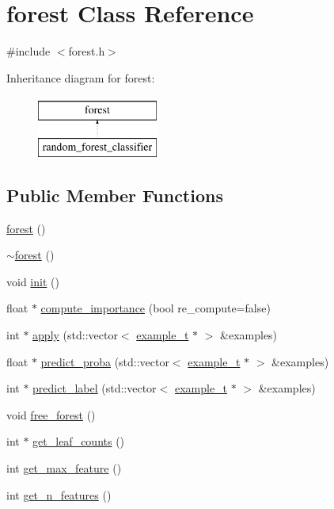 \hypertarget{classforest}{\section{forest Class Reference}
\label{classforest}
}


{\ttfamily \#include $<$forest.\+h$>$}

Inheritance diagram for forest\+:\begin{figure}[H]
\begin{center}
\leavevmode
\includegraphics[height=2.000000cm]{classforest}
\end{center}
\end{figure}
\subsection*{Public Member Functions}
\begin{DoxyCompactItemize}
\item 
\hyperlink{classforest_a2fddb96b4eeb3ecbc3e5423583072329}{forest} ()
\item 
\hyperlink{classforest_ab7475fa2436dfc805b4e77288a899605}{$\sim$forest} ()
\item 
void \hyperlink{classforest_a9b0546d1f12a2d85fe91f0bd6b8af893}{init} ()
\item 
float $\ast$ \hyperlink{classforest_a28e189dcda3707e936bedbf286c54218}{compute\+\_\+importance} (bool re\+\_\+compute=false)
\item 
int $\ast$ \hyperlink{classforest_ad829c40a94c7d32178d834dabefa7538}{apply} (std\+::vector$<$ \hyperlink{classexample__t}{example\+\_\+t} $\ast$ $>$ \&examples)
\item 
float $\ast$ \hyperlink{classforest_add5aac99e45d27ed52dac2d32bf3b915}{predict\+\_\+proba} (std\+::vector$<$ \hyperlink{classexample__t}{example\+\_\+t} $\ast$ $>$ \&examples)
\item 
int $\ast$ \hyperlink{classforest_a8583a5a1d8ac8ad8bcfa8f17dce3b1bd}{predict\+\_\+label} (std\+::vector$<$ \hyperlink{classexample__t}{example\+\_\+t} $\ast$ $>$ \&examples)
\item 
void \hyperlink{classforest_a164df87ebd89bb34592e4d25fdaf4faf}{free\+\_\+forest} ()
\item 
int $\ast$ \hyperlink{classforest_aaebdd60868d43b35e99dbd46b4dafd52}{get\+\_\+leaf\+\_\+counts} ()
\item 
int \hyperlink{classforest_a31b9d3946488765c7d4d1ddb9ed8595e}{get\+\_\+max\+\_\+feature} ()
\item 
int \hyperlink{classforest_a089d5d8a5db74c4ba6298774308dc7ae}{get\+\_\+n\+\_\+features} ()
\end{DoxyCompactItemize}
